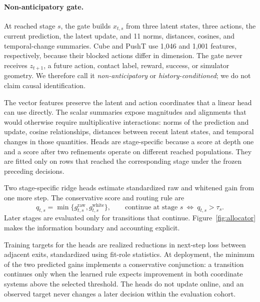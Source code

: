 \documentclass{article}
\newcommand{\raw}{\mathrm{raw}}
\newcommand{\white}{\mathrm{white}}
\begin{document}
\paragraph{Non-anticipatory gate.}
At reached stage \(s\), the gate builds \(x_{t,s}\) from three latent states, three actions, the current prediction, the latest update, and 11 norms, distances, cosines, and temporal-change summaries. Cube and PushT use 1,046 and 1,001 features, respectively, because their blocked actions differ in dimension. The gate never receives \(z_{t+1}\), a future action, contact label, reward, success, or simulator geometry. We therefore call it \emph{non-anticipatory} or \emph{history-conditioned}; we do not claim causal identification.

The vector features preserve the latent and action coordinates that a linear head can use directly. The scalar summaries expose magnitudes and alignments that would otherwise require multiplicative interactions: norms of the prediction and update, cosine relationships, distances between recent latent states, and temporal changes in those quantities. Heads are stage-specific because a score at depth one and a score after two refinements operate on different reached populations. They are fitted only on rows that reached the corresponding stage under the frozen preceding decisions.

Two stage-specific ridge heads estimate standardized raw and whitened gain from one more step. The conservative score and routing rule are
\begin{equation}
 q_{t,s}=\min\{g^{\raw}_{t,s},g^{\white}_{t,s}\},\qquad
 \text{continue at stage }s\ \Longleftrightarrow\ q_{t,s}>\tau_s .
 \label{eq:gate}
\end{equation}
Later stages are evaluated only for transitions that continue. Figure~\ref{fig:allocator} makes the information boundary and accounting explicit.

Training targets for the heads are realized reductions in next-step loss between adjacent exits, standardized using fit-role statistics. At deployment, the minimum of the two predicted gains implements a conservative conjunction: a transition continues only when the learned rule expects improvement in both coordinate systems above the selected threshold. The heads do not update online, and an observed target never changes a later decision within the evaluation cohort.
\end{document}
